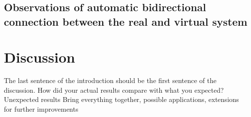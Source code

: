 \documentclass[conference]{IEEEtran}
\begin{document}
    \subsection*{Observations of automatic bidirectional connection between the real and virtual system}
    \section{Discussion}\label{section:discussion}
    The last sentence of the introduction should be the first sentence of the discussion.
    How did your actual results compare with what you expected?
    Unexpected results
    Bring everything together, possible applications, extensions for further improvements
    
    
    
\end{document}

